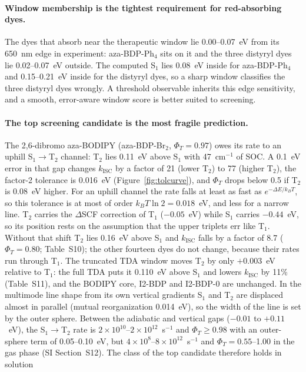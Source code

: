 \documentclass[journal=jctcce,manuscript=article]{achemso}
\newcommand{\kisc}{k_\mathrm{ISC}}
\begin{document}
\paragraph{Window membership is the tightest requirement for red-absorbing dyes.} The dyes that absorb
near the therapeutic window lie 0.00--0.07~eV from its 650~nm edge in experiment: aza-BDP-Ph$_4$ sits on
it and the three distyryl dyes lie 0.02--0.07~eV outside. The computed S$_1$ lies 0.08~eV inside for
aza-BDP-Ph$_4$ and 0.15--0.21~eV inside for the distyryl dyes, so a sharp window classifies the three distyryl
dyes wrongly. A threshold observable inherits this edge sensitivity, and a
smooth, error-aware window score is better suited to screening.

\paragraph{The top screening candidate is the most fragile prediction.} The 2,6-dibromo aza-BODIPY
(aza-BDP-Br$_2$, $\Phi_T=0.97$) owes its rate to an uphill S$_1\to$T$_2$ channel: T$_2$ lies 0.11~eV above
S$_1$ with 47~cm$^{-1}$ of SOC. A 0.1~eV error in that gap changes $\kisc$ by a factor of 21 (lower T$_2$) to 77 (higher T$_2$), the
factor-2 tolerance is 0.016~eV (Figure~\ref{fig:tolcurve}), and $\Phi_T$ drops below 0.5 if T$_2$ is
0.08~eV higher. For an uphill channel the rate falls at least as fast as
$e^{-\Delta E/k_BT}$, so this tolerance is at most of order $k_BT\ln2=0.018$~eV, and less for a narrow line. T$_2$ carries the $\Delta$SCF correction of T$_1$ ($-0.05$~eV) while
S$_1$ carries $-0.44$~eV, so its position rests on the assumption that the upper triplets err like T$_1$. Without
that shift T$_2$ lies 0.16~eV above S$_1$ and $\kisc$ falls by a factor of 8.7 ($\Phi_T=0.80$; Table~S10); the other
fourteen dyes do not change, because their rates run through T$_1$. The truncated TDA window moves T$_2$ by only $+0.003$~eV relative to T$_1$: the full TDA puts it 0.110~eV above
S$_1$ and lowers $\kisc$ by 11\% (Table~S11), and the BODIPY core, I2-BDP and I2-BDP-0 are unchanged. In the multimode line shape from its own vertical gradients S$_1$ and T$_2$ are displaced almost in
parallel (mutual reorganization 0.014~eV), so the width of the line is set by the outer sphere. Between the
adiabatic and vertical gaps ($-0.01$ to $+0.11$~eV), the S$_1\to$T$_2$ rate is $2\times10^{10}$--$2\times10^{12}$~s$^{-1}$
and $\Phi_T\ge0.98$ with an outer-sphere term of 0.05--0.10~eV, but $4\times10^{8}$--$8\times10^{12}$~s$^{-1}$ and
$\Phi_T=0.55$--1.00 in the gas phase (SI Section~S12). The class of the top candidate therefore holds in solution
\end{document}
